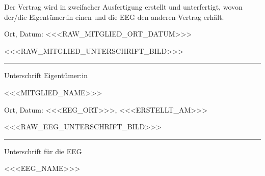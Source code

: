 \documentclass[a4paper,11pt]{article}
\begin{document}
Der Vertrag wird in zweifacher Ausfertigung erstellt und unterfertigt, wovon der/die Eigentümer:in einen und die EEG den anderen Vertrag erhält.

\par\vspace{1.5\baselineskip}

\noindent
\begin{minipage}[t]{0.48\textwidth}
  Ort, Datum: <<<RAW_MITGLIED_ORT_DATUM>>>
  \par\vspace{3\baselineskip}
  <<<RAW_MITGLIED_UNTERSCHRIFT_BILD>>>\rule{5cm}{0.4pt}\par
  Unterschrift Eigentümer:in\par
  <<<MITGLIED_NAME>>>
\end{minipage}%
\hfill
\begin{minipage}[t]{0.48\textwidth}
  Ort, Datum: <<<EEG_ORT>>>, <<<ERSTELLT_AM>>>
  \par\vspace{3\baselineskip}
  <<<RAW_EEG_UNTERSCHRIFT_BILD>>>\rule{5cm}{0.4pt}\par
  Unterschrift für die EEG\par
  <<<EEG_NAME>>>
\end{minipage}
\end{document}
